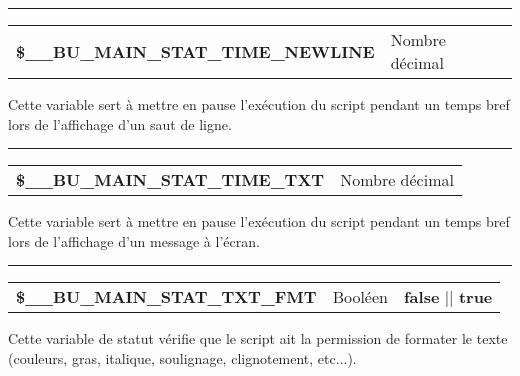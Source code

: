 \documentclass[a4paper,10pt]{article}
\begin{document}

\par\noindent\rule{\textwidth}{0.4pt}

\begin{justify}
    \begin{tabular}{l|l}
        \textbf{\color{vars}\$\_\_BU\_MAIN\_STAT\_TIME\_NEWLINE}  & Nombre décimal\\[1\baselineskip]
    \end{tabular}
\end{justify}

\begin{justify}
    Cette variable sert à mettre en pause l'exécution du script pendant un temps bref lors de l'affichage d'un saut de ligne.
\end{justify}


\par\noindent\rule{\textwidth}{0.4pt}

\begin{justify}
    \begin{tabular}{l|l}
        \textbf{\color{vars}\$\_\_BU\_MAIN\_STAT\_TIME\_TXT}  & Nombre décimal\\[1\baselineskip]
    \end{tabular}
\end{justify}

\begin{justify}
    Cette variable sert à mettre en pause l'exécution du script pendant un temps bref lors de l'affichage d'un message à l'écran.
\end{justify}


\par\noindent\rule{\textwidth}{0.4pt}

\begin{justify}
    \begin{tabular}{l|l|l}
        \textbf{\color{vars}\$\_\_BU\_MAIN\_STAT\_TXT\_FMT}   & Booléen & \textbf{false} || \textbf{true}\\[1\baselineskip]
    \end{tabular}
\end{justify}

\begin{justify}
    Cette variable de statut vérifie que le script ait la permission de formater le texte (couleurs, gras, italique, soulignage, clignotement, etc...).
\end{justify}
\end{document}
